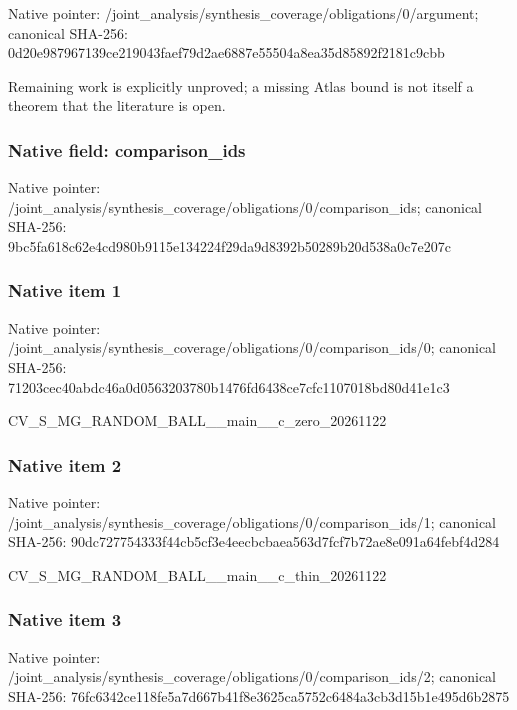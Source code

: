 \documentclass[10pt,a4paper]{article}
\begin{document}
Native pointer: /joint\_analysis/synthesi\allowbreak{}s\_coverage/obligations/0\allowbreak{}/argument; canonical SHA-256: 0d20e987967139ce219043fa\allowbreak{}ef79d2ae6887e55504a8ea35\allowbreak{}d85892f2181c9cbb


Remaining work is explicitly unproved; a missing Atlas bound is not itself a theorem that the literature is open.


\subsubsection{Native field: comparison\_ids}


Native pointer: /joint\_analysis/synthesi\allowbreak{}s\_coverage/obligations/0\allowbreak{}/comparison\_ids; canonical SHA-256: 9bc5fa618c62e4cd980b9115\allowbreak{}e134224f29da9d8392b50289\allowbreak{}b20d538a0c7e207c



\subsubsection{Native item 1}


Native pointer: /joint\_analysis/synthesi\allowbreak{}s\_coverage/obligations/0\allowbreak{}/comparison\_ids/0; canonical SHA-256: 71203cec40abdc46a0d05632\allowbreak{}03780b1476fd6438ce7cfc11\allowbreak{}07018bd80d41e1c3


CV\_S\_MG\_RANDOM\_BALL\_\_mai\allowbreak{}n\_\_c\_zero\_20261122


\subsubsection{Native item 2}


Native pointer: /joint\_analysis/synthesi\allowbreak{}s\_coverage/obligations/0\allowbreak{}/comparison\_ids/1; canonical SHA-256: 90dc727754333f44cb5cf3e4\allowbreak{}eecbcbaea563d7fcf7b72ae8\allowbreak{}e091a64febf4d284


CV\_S\_MG\_RANDOM\_BALL\_\_mai\allowbreak{}n\_\_c\_thin\_20261122


\subsubsection{Native item 3}


Native pointer: /joint\_analysis/synthesi\allowbreak{}s\_coverage/obligations/0\allowbreak{}/comparison\_ids/2; canonical SHA-256: 76fc6342ce118fe5a7d667b4\allowbreak{}1f8e3625ca5752c6484a3cb3\allowbreak{}d15b1e495d6b2875
\end{document}
